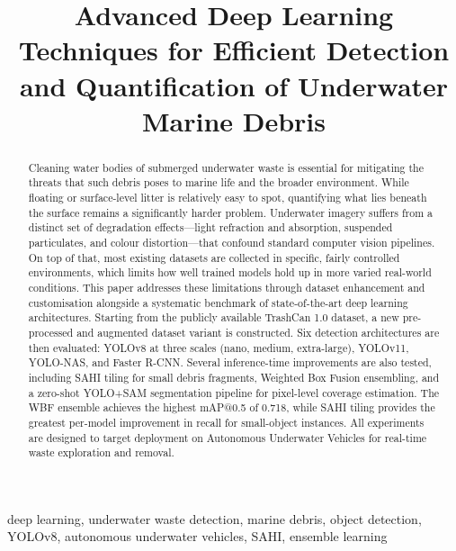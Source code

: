 \documentclass[conference]{IEEEtran}
\begin{document}
\title{Advanced Deep Learning Techniques for Efficient Detection
and Quantification of Underwater Marine Debris}

\author{
}

\maketitle

\begin{abstract}
Cleaning water bodies of submerged underwater waste is essential for
mitigating the threats that such debris poses to marine life and the
broader environment. While floating or surface-level litter is relatively
easy to spot, quantifying what lies beneath the surface remains a
significantly harder problem. Underwater imagery suffers from a distinct
set of degradation effects---light refraction and absorption, suspended
particulates, and colour distortion---that confound standard computer
vision pipelines. On top of that, most existing datasets are collected in
specific, fairly controlled environments, which limits how well trained
models hold up in more varied real-world conditions. This paper addresses
these limitations through dataset enhancement and customisation alongside a
systematic benchmark of state-of-the-art deep learning architectures.
Starting from the publicly available TrashCan 1.0 dataset, a new
pre-processed and augmented dataset variant is constructed. Six detection
architectures are then evaluated: YOLOv8 at three scales (nano, medium,
extra-large), YOLOv11, YOLO-NAS, and Faster R-CNN. Several
inference-time improvements are also tested, including SAHI tiling for
small debris fragments, Weighted Box Fusion ensembling, and a zero-shot
YOLO+SAM segmentation pipeline for pixel-level coverage estimation. The
WBF ensemble achieves the highest mAP@0.5 of 0.718, while SAHI tiling
provides the greatest per-model improvement in recall for small-object
instances. All experiments are designed to target deployment on Autonomous
Underwater Vehicles for real-time waste exploration and removal.
\end{abstract}

\begin{IEEEkeywords}
deep learning, underwater waste detection, marine debris, object detection,
YOLOv8, autonomous underwater vehicles, SAHI, ensemble learning
\end{IEEEkeywords}
\end{document}
